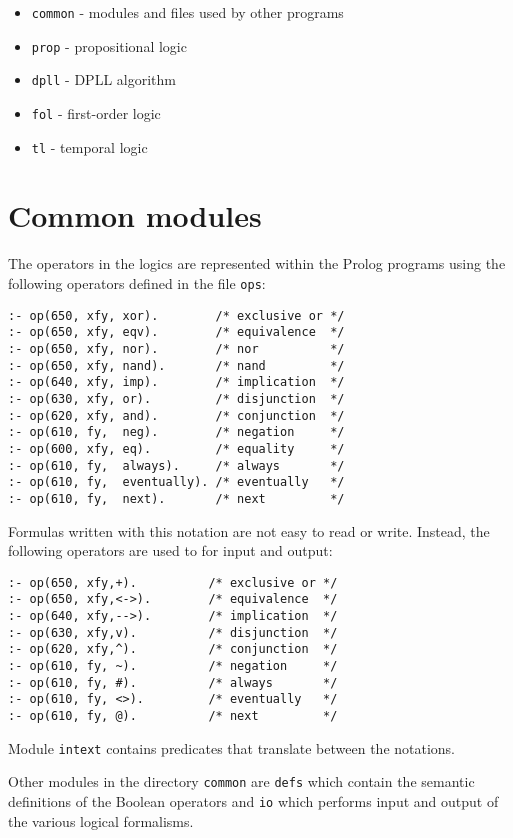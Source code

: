\documentclass[11pt]{article}
\newcommand*{\p}[1]{\textup{\texttt{#1}}}
\begin{document}
\begin{itemize}
\item \p{common} - modules and files used by other programs
\item \p{prop}   - propositional logic
\item \p{dpll}   - DPLL algorithm
\item \p{fol}    - first-order logic
\item \p{tl}     - temporal logic
\end{itemize}

\section{Common modules}\label{s.common}

The operators in the logics are represented within the Prolog programs
using the following operators defined in the file \p{ops}:

\begin{verbatim}
:- op(650, xfy, xor).        /* exclusive or */
:- op(650, xfy, eqv).        /* equivalence  */
:- op(650, xfy, nor).        /* nor          */
:- op(650, xfy, nand).       /* nand         */
:- op(640, xfy, imp).        /* implication  */
:- op(630, xfy, or).         /* disjunction  */
:- op(620, xfy, and).        /* conjunction  */
:- op(610, fy,  neg).        /* negation     */
:- op(600, xfy, eq).         /* equality     */
:- op(610, fy,  always).     /* always       */
:- op(610, fy,  eventually). /* eventually   */
:- op(610, fy,  next).       /* next         */
\end{verbatim}

Formulas written with this notation are not easy to read or write.
Instead, the following operators are used to for input and output:

\begin{verbatim}
:- op(650, xfy,+).          /* exclusive or */
:- op(650, xfy,<->).        /* equivalence  */
:- op(640, xfy,-->).        /* implication  */
:- op(630, xfy,v).          /* disjunction  */
:- op(620, xfy,^).          /* conjunction  */
:- op(610, fy, ~).          /* negation     */
:- op(610, fy, #).          /* always       */
:- op(610, fy, <>).         /* eventually   */
:- op(610, fy, @).          /* next         */
\end{verbatim}

Module \p{intext} contains predicates that translate between the
notations.

Other modules in the directory \p{common} are \p{defs} which contain the
semantic definitions of the Boolean operators and \p{io} which performs
input and output of the various logical formalisms. 
\end{document}
